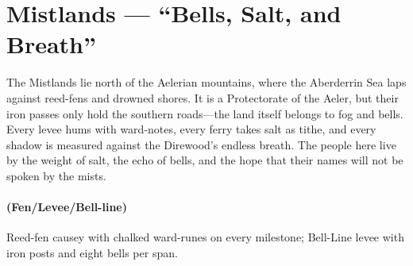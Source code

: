 \section{Mistlands --- ``Bells, Salt, and Breath''}
\label{chap:mistlands}

\begin{tcolorbox}[colback=black!3,colframe=black!40!white,title={Theme \& Atmosphere}]
The Mistlands lie north of the Aelerian mountains, where the Aberderrin Sea laps against reed-fens and drowned shores. It is a Protectorate of the Aeler, but their iron passes only hold the southern roads---the land itself belongs to fog and bells. Every levee hums with ward-notes, every ferry takes salt as tithe, and every shadow is measured against the Direwood's endless breath. The people here live by the weight of salt, the echo of bells, and the hope that their names will not be spoken by the mists.
\end{tcolorbox}

\paragraph*{(Fen/Levee/Bell-line)} Reed-fen causey with chalked ward-runes on every milestone; Bell-Line levee with iron posts and eight bells per span.

